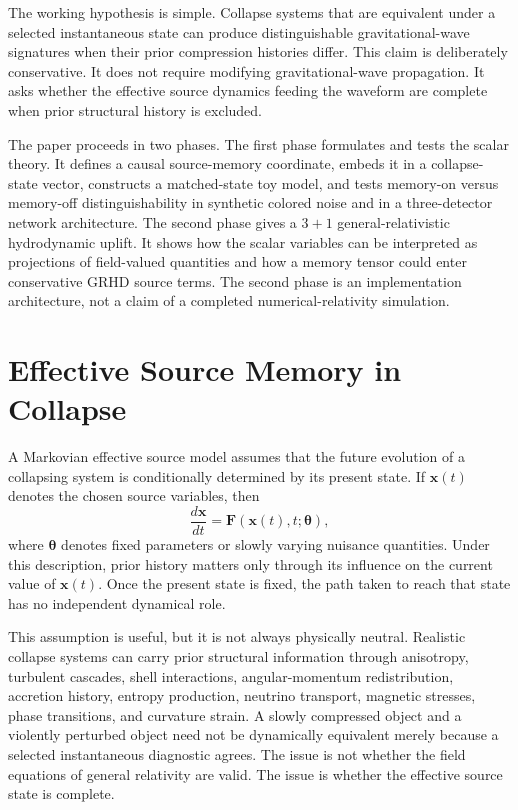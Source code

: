 \documentclass[11pt]{article}
\begin{document}
The working hypothesis is simple. Collapse systems that are equivalent under a selected instantaneous state can produce distinguishable gravitational-wave signatures when their prior compression histories differ. This claim is deliberately conservative. It does not require modifying gravitational-wave propagation. It asks whether the effective source dynamics feeding the waveform are complete when prior structural history is excluded.

The paper proceeds in two phases. The first phase formulates and tests the scalar theory. It defines a causal source-memory coordinate, embeds it in a collapse-state vector, constructs a matched-state toy model, and tests memory-on versus memory-off distinguishability in synthetic colored noise and in a three-detector network architecture. The second phase gives a \(3+1\) general-relativistic hydrodynamic uplift. It shows how the scalar variables can be interpreted as projections of field-valued quantities and how a memory tensor could enter conservative GRHD source terms. The second phase is an implementation architecture, not a claim of a completed numerical-relativity simulation.

\section{Effective Source Memory in Collapse}
\label{sec:source_memory}

A Markovian effective source model assumes that the future evolution of a collapsing system is conditionally determined by its present state. If \(\bm{x}(t)\) denotes the chosen source variables, then
\begin{equation}
\frac{d\bm{x}}{dt}=\bm{F}\left(\bm{x}(t),t;\bm{\theta}\right),
\end{equation}
where \(\bm{\theta}\) denotes fixed parameters or slowly varying nuisance quantities. Under this description, prior history matters only through its influence on the current value of \(\bm{x}(t)\). Once the present state is fixed, the path taken to reach that state has no independent dynamical role.

This assumption is useful, but it is not always physically neutral. Realistic collapse systems can carry prior structural information through anisotropy, turbulent cascades, shell interactions, angular-momentum redistribution, accretion history, entropy production, neutrino transport, magnetic stresses, phase transitions, and curvature strain. A slowly compressed object and a violently perturbed object need not be dynamically equivalent merely because a selected instantaneous diagnostic agrees. The issue is not whether the field equations of general relativity are valid. The issue is whether the effective source state is complete.
\end{document}

